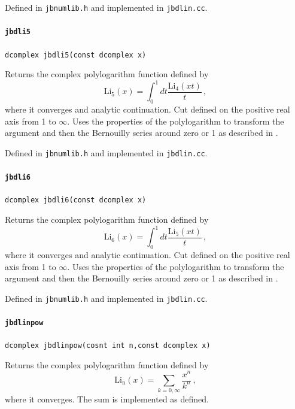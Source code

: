 \documentclass[12pt,a4paper]{article}
\newcommand{\mytt}[1]{\texttt{#1}}
\newcommand{\newfunction}[1]{\mytt{#1}\index{\mytt{#1}}}
\begin{document}
Defined in \mytt{jbnumlib.h} and implemented in \mytt{jbdlin.cc}.

\paragraph{\newfunction{jbdli5}}

\mytt{dcomplex jbdli5(const dcomplex x)}

Returns the complex polylogarithm function defined by
\begin{equation}
\mathrm{Li_5}(x) = \int_0^1 dt \frac{\mathrm{Li}_4(xt)}{t}\,,
\end{equation}
where it converges and analytic continuation. Cut defined on the
positive real axis from 1 to $\infty$.
Uses the properties of the polylogarithm to transform the argument
and then the Bernouilly series around zero or 1 as described in
\cite{Frellesvig:2016ske}.

Defined in \mytt{jbnumlib.h} and implemented in \mytt{jbdlin.cc}.

\paragraph{\newfunction{jbdli6}}

\mytt{dcomplex jbdli6(const dcomplex x)}

Returns the complex polylogarithm function defined by
\begin{equation}
\mathrm{Li_6}(x) = \int_0^1 dt \frac{\mathrm{Li}_5(xt)}{t}\,,
\end{equation}
where it converges and analytic continuation. Cut defined on the
positive real axis from 1 to $\infty$.
Uses the properties of the polylogarithm to transform the argument
and then the Bernouilly series around zero or 1 as described in
\cite{Frellesvig:2016ske}.

Defined in \mytt{jbnumlib.h} and implemented in \mytt{jbdlin.cc}.

\paragraph{\newfunction{jbdlinpow}}

\mytt{dcomplex jbdlinpow(cosnt int n,const dcomplex x)}

Returns the complex polylogarithm function defined by
\begin{equation}
\mathrm{Li_n}(x) = \sum_{k=0,\infty}  \frac{x^n}{k^n}\,,
\end{equation}
where it converges. The sum is implemented as defined.
\end{document}
